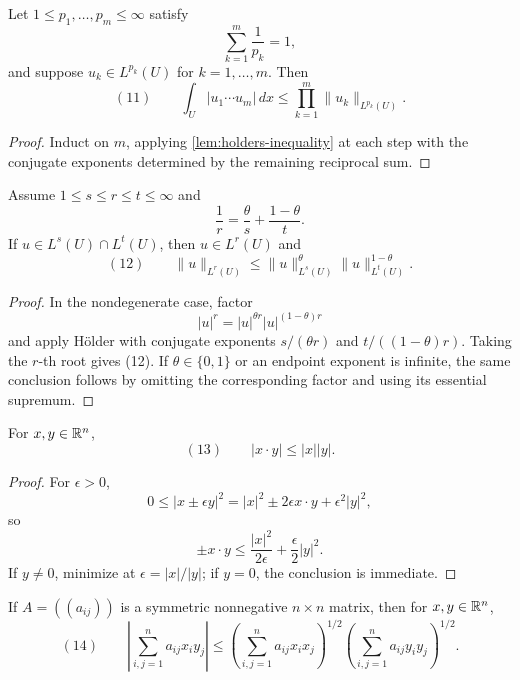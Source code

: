 \begin{lemma}
\label{lem:general-holder-inequality}

Let $1\leq p_1,\ldots,p_m\leq\infty$ satisfy
\[
\sum_{k=1}^m\frac1{p_k}=1,
\]
and suppose $u_k\in L^{p_k}(U)$ for $k=1,\ldots,m$. Then
\[
(11)\qquad
\int_U|u_1\cdots u_m|\,dx
\leq\prod_{k=1}^m\|u_k\|_{L^{p_k}(U)}.
\]
\end{lemma}
\begin{proof}
\sketch Induct on $m$, applying \cref{lem:holders-inequality} at each step with the conjugate exponents determined by the remaining reciprocal sum.
\end{proof}

\begin{lemma}
\label{lem:interpolation-inequality-lp-norms}

Assume $1\leq s\leq r\leq t\leq\infty$ and
\[
\frac1r=\frac\theta s+\frac{1-\theta}{t}.
\]
If $u\in L^s(U)\cap L^t(U)$, then $u\in L^r(U)$ and
\[
(12)\qquad
\|u\|_{L^r(U)}
\leq\|u\|_{L^s(U)}^\theta
\|u\|_{L^t(U)}^{1-\theta}.
\]
\end{lemma}
\begin{proof}
\sketch In the nondegenerate case, factor
\[
|u|^r=|u|^{\theta r}|u|^{(1-\theta)r}
\]
and apply H\"older with conjugate exponents $s/(\theta r)$ and $t/((1-\theta)r)$. Taking the $r$-th root gives (12). If $\theta\in\{0,1\}$ or an endpoint exponent is infinite, the same conclusion follows by omitting the corresponding factor and using its essential supremum.
\end{proof}

\begin{lemma}
\label{lem:cauchy-schwarz-inequality}
For $x,y\in\mathbb{R}^n$,
\[
(13)\qquad |x\cdot y|\leq|x||y|.
\]
\end{lemma}
\begin{proof}
\sketch For $\epsilon>0$,
\[
0\leq|x\pm\epsilon y|^2
=|x|^2\pm2\epsilon x\cdot y+\epsilon^2|y|^2,
\]
so
\[
\pm x\cdot y
\leq\frac{|x|^2}{2\epsilon}+\frac\epsilon2|y|^2.
\]
If $y\ne0$, minimize at $\epsilon=|x|/|y|$; if $y=0$, the conclusion is immediate.
\end{proof}

\begin{remark}
\label{rem:cauchy-schwarz-matrix-form}

If $A=((a_{ij}))$ is a symmetric nonnegative $n\times n$ matrix, then for $x,y\in\mathbb{R}^n$,
\[
(14)\qquad
\left|\sum_{i,j=1}^na_{ij}x_iy_j\right|
\leq
\left(\sum_{i,j=1}^na_{ij}x_ix_j\right)^{1/2}
\left(\sum_{i,j=1}^na_{ij}y_iy_j\right)^{1/2}.
\]
\end{remark}

